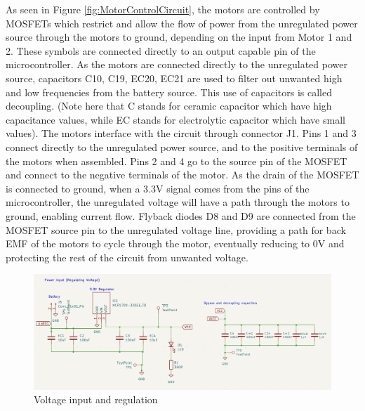 As seen in Figure \ref{fig:MotorControlCircuit}, the motors are controlled by MOSFETs which restrict and allow the flow of power from the unregulated power source through the motors to ground, depending on the input from Motor 1 and 2. These symbols are connected directly to an output capable pin of the microcontroller. As the motors are connected directly to the unregulated power source, capacitors C10, C19, EC20, EC21 are used to filter out unwanted high and low frequencies from the battery source. This use of capacitors is called decoupling. (Note here that C stands for ceramic capacitor which have high capacitance values, while EC stands for electrolytic capacitor which have small values). The motors interface with the circuit through connector J1. Pins 1 and 3 connect directly to the unregulated power source, and to the positive terminals of the motors when assembled. Pins 2 and 4 go to the source pin of the MOSFET and connect to the negative terminals of the motor. As the drain of the MOSFET is connected to ground, when a 3.3V signal comes from the pins of the microcontroller, the unregulated voltage will have a path through the motors to ground, enabling current flow. Flyback diodes D8 and D9 are connected from the MOSFET source pin to the unregulated voltage line, providing a path for back EMF of the motors to cycle through the motor, eventually reducing to 0V and protecting the rest of the circuit from unwanted voltage. 
\\

\begin{figure}[H]
    \centering
    \includegraphics[width=0.8\linewidth]{REPORT/VinputandReg.png}
    \caption{Voltage input and regulation}
    \label{fig:VoltageinandReg}
\end{figure}

